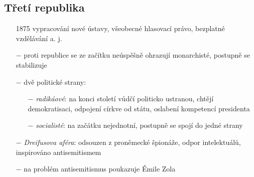 \documentclass{article}
\begin{document}
\subsection*{Třetí republika}
\begin{itemize}
    \vspace{-0.5em}
    \setlength\itemsep{0.15em}
    \item[1875] vypracování nové ústavy, všeobecné hlasovací právo, bezplatné vzdělávání a. j.
    \item[$-$] proti republice se ze začítku neúspěšně ohrazují monarchisté, postupně se stabilizuje
    \item[$-$] dvě politické strany:
    \begin{itemize}
        \vspace{-0.5em}
        \setlength\itemsep{0.15em}
        \item[$-$] \textit{radikáové}: na konci století vůdčí politicko ustranou, chtějí demokratisaci, odpojení církve od státu, oslabení kompetencí presidenta
        \item[$-$] \textit{socialisté}: na začátku nejednotní, postupně se spojí do jedné strany
    \end{itemize}
    \item[$-$] \textit{Dreifusova aféra}: odsouzen z proněmecké špionáže, odpor intelektuálů, inspirováno antisemitismem
    \item[$-$] na problém antisemitismus poukazuje Émile Zola
\end{itemize}
\end{document}
